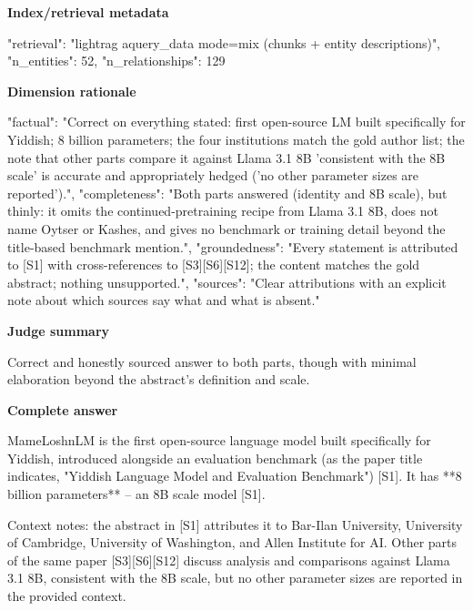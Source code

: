 \documentclass[10pt]{article}
\begin{document}
\textbf{Index/retrieval metadata}
\begin{EvidenceText}
{
  "retrieval": "lightrag aquery_data mode=mix (chunks + entity descriptions)",
  "n_entities": 52,
  "n_relationships": 129
}
\end{EvidenceText}

\textbf{Dimension rationale}
\begin{EvidenceText}
{
  "factual": "Correct on everything stated: first open-source LM built specifically for Yiddish; 8 billion parameters; the four institutions match the gold author list; the note that other parts compare it against Llama 3.1 8B 'consistent with the 8B scale' is accurate and appropriately hedged ('no other parameter sizes are reported').",
  "completeness": "Both parts answered (identity and 8B scale), but thinly: it omits the continued-pretraining recipe from Llama 3.1 8B, does not name Oytser or Kashes, and gives no benchmark or training detail beyond the title-based benchmark mention.",
  "groundedness": "Every statement is attributed to [S1] with cross-references to [S3][S6][S12]; the content matches the gold abstract; nothing unsupported.",
  "sources": "Clear attributions with an explicit note about which sources say what and what is absent."
}
\end{EvidenceText}

\textbf{Judge summary}
\begin{EvidenceText}
Correct and honestly sourced answer to both parts, though with minimal elaboration beyond the abstract's definition and scale.
\end{EvidenceText}

\textbf{Complete answer}
\begin{AnswerText}
MameLoshnLM is the first open-source language model built specifically for Yiddish, introduced alongside an evaluation benchmark (as the paper title indicates, "Yiddish Language Model and Evaluation Benchmark") [S1]. It has **8 billion parameters** -- an 8B scale model [S1].

Context notes: the abstract in [S1] attributes it to Bar-Ilan University, University of Cambridge, University of Washington, and Allen Institute for AI. Other parts of the same paper [S3][S6][S12] discuss analysis and comparisons against Llama 3.1 8B, consistent with the 8B scale, but no other parameter sizes are reported in the provided context.
\end{AnswerText}
\end{document}
